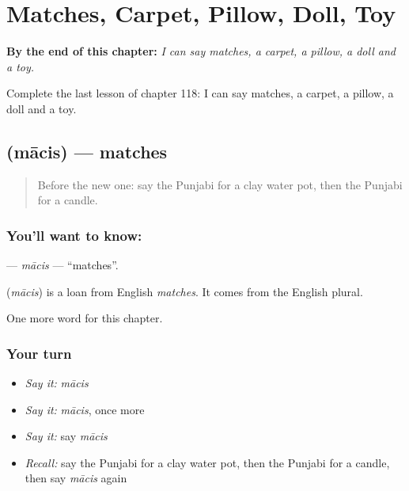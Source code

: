
\chapter{Matches, Carpet, Pillow, Doll, Toy}
\label{ch:pa-matches-carpet-pillow-doll-toy}

\begin{chapteropening}
\textbf{By the end of this chapter:} \emph{I can say matches, a carpet, a pillow, a doll and a toy.}

Complete the last lesson of chapter 118: I can say matches, a carpet, a pillow, a doll and a toy.
\end{chapteropening}

\section[\texorpdfstring{\pa{ਮਾਚਿਸ} (mācis)}{ਮਾਚਿਸ (mācis)}]{ (mācis) — matches}

\label{lesson:PA-C118-macis}



\begin{quote}
Before the new one: say the Punjabi for a clay water pot, then the Punjabi for a candle.
\end{quote}

\subsection*{You'll want to know: }
\textbf{} — \emph{mācis} — \textquotedblleft{}matches\textquotedblright{}.

\begin{cousinweb}
\textbf{} (\emph{mācis}) is a loan from English \emph{matches}. It comes from the English plural.
\end{cousinweb}

\begin{grammarlens}[title={What you've built}]
One more word for this chapter.
\end{grammarlens}

\subsection*{Your turn}
\begin{itemize}
\raggedright
  \item \emph{Say it:} \emph{mācis}
  \item \emph{Say it:} \emph{mācis}, once more
  \item \emph{Say it:} say \emph{mācis}
  \item \emph{Recall:} say the Punjabi for a clay water pot, then the Punjabi for a candle, then say \emph{mācis} again
\end{itemize}

